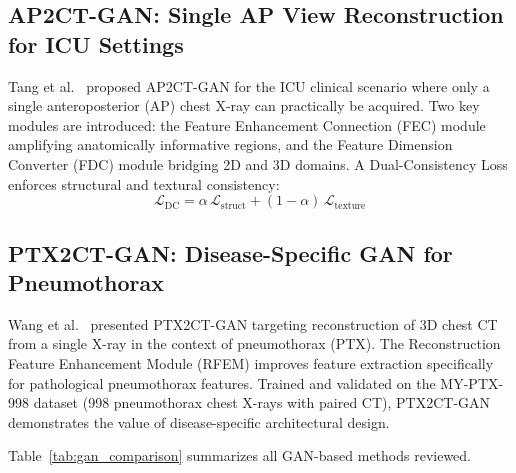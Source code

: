 \documentclass[10pt,twocolumn,a4paper]{article}
\begin{document}
\subsection{AP2CT-GAN: Single AP View Reconstruction for ICU Settings}
\label{sec:gan:ap2ct}

Tang et al.~\cite{ap2ctgan} proposed AP2CT-GAN for the ICU clinical scenario
where only a single anteroposterior (AP) chest X-ray can practically be
acquired. Two key modules are introduced: the Feature Enhancement Connection
(FEC) module amplifying anatomically informative regions, and the Feature
Dimension Converter (FDC) module bridging 2D and 3D domains. A Dual-Consistency
Loss enforces structural and textural consistency:
\begin{equation}
\mathcal{L}_\text{DC} = \alpha\,\mathcal{L}_\text{struct}
+ (1-\alpha)\,\mathcal{L}_\text{texture}
\label{eq:dcloss}
\end{equation}

\subsection{PTX2CT-GAN: Disease-Specific GAN for Pneumothorax}
\label{sec:gan:ptx}

Wang et al.~\cite{ptx2ctgan} presented PTX2CT-GAN targeting reconstruction of
3D chest CT from a single X-ray in the context of pneumothorax (PTX). The
Reconstruction Feature Enhancement Module (RFEM) improves feature extraction
specifically for pathological pneumothorax features. Trained and validated on
the MY-PTX-998 dataset (998 pneumothorax chest X-rays with paired CT),
PTX2CT-GAN demonstrates the value of disease-specific architectural design.

Table~\ref{tab:gan_comparison} summarizes all GAN-based methods reviewed.
\end{document}
